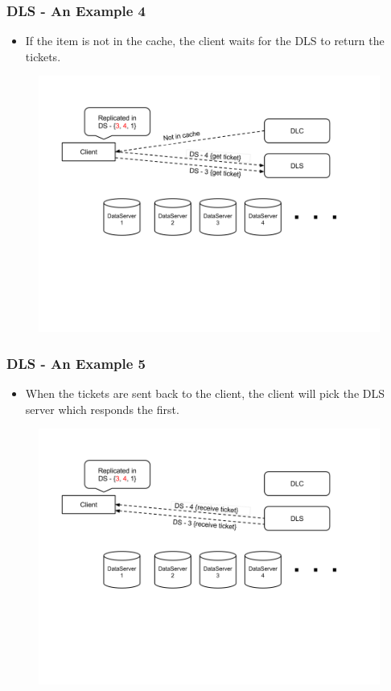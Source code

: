 \documentclass{beamer}
\begin{document}
\begin{frame}
  \frametitle{DLS - An Example 4}
  \begin{itemize}
    \item If the item is not in the cache, the client waits for the DLS to
      return the tickets.
  \end{itemize}
  \begin{figure}
    \begin{center}
      \centerline{\includegraphics[scale=0.40]{img/DLS_Example5.png}}
    \end{center}
  \end{figure}
\end{frame}


\begin{frame}
  \frametitle{DLS - An Example 5}
  \begin{itemize}
    \item When the tickets are sent back to the client, the client will pick
      the DLS server which responds the first.
  \end{itemize}
  \begin{figure}
    \begin{center}
      \centerline{\includegraphics[scale=0.40]{img/DLS_Example6.png}}
    \end{center}
  \end{figure}
\end{frame}
\end{document}
